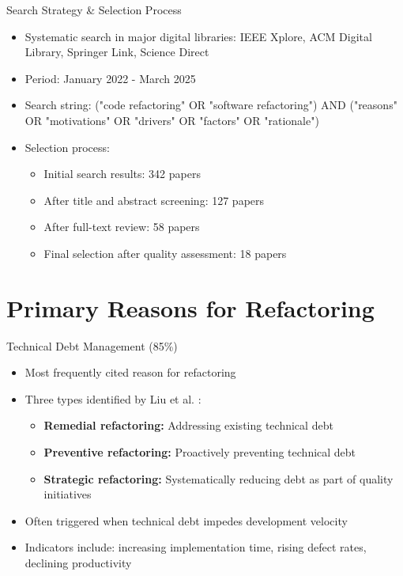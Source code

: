 \documentclass{beamer}
\begin{document}
\begin{frame}{Search Strategy \& Selection Process}
    \begin{itemize}
        \item Systematic search in major digital libraries: IEEE Xplore, ACM Digital Library, Springer Link, Science Direct
        \item Period: January 2022 - March 2025
        \item Search string: ("code refactoring" OR "software refactoring") AND ("reasons" OR "motivations" OR "drivers" OR "factors" OR "rationale")
        \item Selection process:
            \begin{itemize}
                \item Initial search results: 342 papers
                \item After title and abstract screening: 127 papers
                \item After full-text review: 58 papers
                \item Final selection after quality assessment: 18 papers
            \end{itemize}
    \end{itemize}
\end{frame}

\section{Primary Reasons for Refactoring}
\begin{frame}{Technical Debt Management (85\%)}
    \begin{itemize}
        \item Most frequently cited reason for refactoring
        \item Three types identified by Liu et al. \cite{liu2023}:
            \begin{itemize}
                \item \textbf{Remedial refactoring:} Addressing existing technical debt
                \item \textbf{Preventive refactoring:} Proactively preventing technical debt
                \item \textbf{Strategic refactoring:} Systematically reducing debt as part of quality initiatives
            \end{itemize}
        \item Often triggered when technical debt impedes development velocity
        \item Indicators include: increasing implementation time, rising defect rates, declining productivity
    \end{itemize}
\end{frame}
\end{document}
